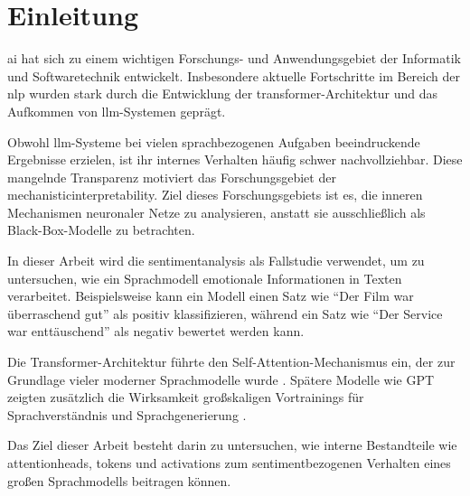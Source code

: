 \section{Einleitung}

\gls{ai} hat sich zu einem wichtigen Forschungs- und Anwendungsgebiet der Informatik und Softwaretechnik entwickelt. 
Insbesondere aktuelle Fortschritte im Bereich der \gls{nlp} wurden stark durch die Entwicklung der 
\gls{transformer}-Architektur und das Aufkommen von \gls{llm}-Systemen geprägt.

Obwohl \gls{llm}-Systeme bei vielen sprachbezogenen Aufgaben beeindruckende Ergebnisse erzielen, 
ist ihr internes Verhalten häufig schwer nachvollziehbar. Diese mangelnde Transparenz motiviert 
das Forschungsgebiet der \gls{mechanisticinterpretability}. Ziel dieses Forschungsgebiets ist es, 
die inneren Mechanismen neuronaler Netze zu analysieren, anstatt sie ausschließlich als Black-Box-Modelle zu betrachten.

In dieser Arbeit wird die \gls{sentimentanalysis} als Fallstudie verwendet, um zu untersuchen, 
wie ein Sprachmodell emotionale Informationen in Texten verarbeitet. Beispielsweise kann ein Modell 
einen Satz wie ``Der Film war überraschend gut'' als positiv klassifizieren, während ein Satz wie 
``Der Service war enttäuschend'' als negativ bewertet werden kann.

Die Transformer-Architektur führte den Self-Attention-Mechanismus ein, der zur Grundlage vieler moderner 
Sprachmodelle wurde \cite{vaswani2017attention}. Spätere Modelle wie GPT zeigten zusätzlich die Wirksamkeit 
großskaligen Vortrainings für Sprachverständnis und Sprachgenerierung \cite{radford2018improving}.

Das Ziel dieser Arbeit besteht darin zu untersuchen, wie interne Bestandteile wie \glspl{attentionhead}, 
\glspl{token} und \glspl{activation} zum sentimentbezogenen Verhalten eines großen Sprachmodells beitragen können.